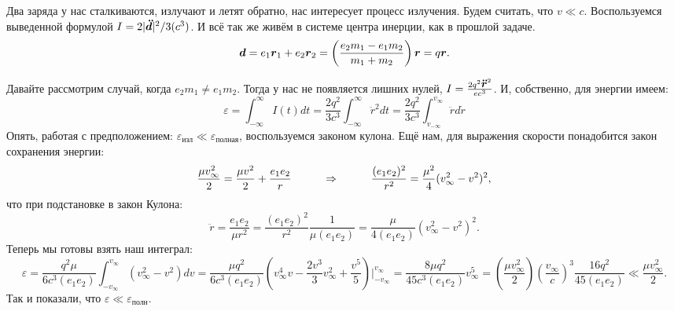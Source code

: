 
Два заряда у нас сталкиваются, излучают и летят обратно, нас интересует процесс излучения. Будем считать, что $v \ll c$.
Воспользуемся выведенной формулой $I = 2 |\mbox{\boldmath $\ddot{d}$}|^2/3(c^3)$.
И всё так же живём в системе центра инерции, как в прошлой задаче.
\begin{equation*}
    \mbox{\boldmath $d$} = e_1 \mbox{\boldmath $r$}_1 + e_2 \mbox{\boldmath $r$}_2 = \left(\frac{e_2 m_1 - e_1 m_2}{m_1 + m_2}\right) \mbox{\boldmath $r$} = q \mbox{\boldmath $r$}.
\end{equation*}

Давайте рассмотрим случай, когда $e_2 m_1 \neq e_1 m_2$. Тогда у нас не появляется лишних нулей, $I = \frac{ 2 q^2 \mbox{\boldmath $\ddot{r}$}^2}{e c^3}$. И, собственно, для энергии имеем:
\begin{equation*}
    \varepsilon = \int_{-\infty}^{\infty} I(t) dt = \frac{2 q^2}{3 c^3} \int_{-\infty}^{\infty} \ddot{r}^2 d t
    =
    \frac{2 q^2}{3 c^3} \int_{v_{-\infty}}^{v_{\infty}} \ddot{r} d \dot{r}
\end{equation*}
Опять, работая с предположением: $\varepsilon_{\text{изл}}\ll \varepsilon_{\text{полная}}$, воспользуемся законом кулона. Ещё нам, для выражения скорости понадобится закон сохранения энергии:
\begin{equation*}
    \frac{\mu v^2_\infty}{2} = \frac{\mu v^2}{2} + \frac{e_1 e_2}{r}
    \hspace{1 cm}
    \Rightarrow
    \hspace{1 cm}
    \frac{(e_1 e_2)^2}{r^2} = \frac{\mu^2}{4} (v_\infty^2 - v^2)^2,
\end{equation*}
что при подстановке в закон Кулона:
\begin{equation*}
    \ddot{r} = \frac{e_1 e_2}{\mu r^2} = \frac{(e_1 e_2)^2}{r^2} \frac{1}{\mu (e_1 e_2)}
    =
    \frac{\mu}{4 (e_1 e_2)} (v_\infty^2 - v^2)^2.
\end{equation*}
Теперь мы готовы взять наш интеграл:
\begin{equation*}
    \varepsilon = \frac{q^2 \mu}{6 c^3 (e_1 e_2)} \int_{- v_\infty}^{v_\infty} (v_\infty^2 - v^2) d v
    =
    \frac{\mu q^2}{6 c^3 (e_1 e_2)} \left(v_\infty^4 v - \frac{2 v^{3}}{3} v_\infty^2 + \frac{v^5}{5}\right) \bigg|_{-v_\infty}^{v_\infty}
    =
    \frac{8 \mu q^2}{45 c^3 (e_1 e_2)} v_\infty^5
    =
    \left(\frac{\mu v_\infty^2}{2}\right) \left(\frac{v_\infty}{c}\right)^3 \frac{16 q^2}{45 (e_1 e_2)}
    \ll \frac{\mu v_\infty^2}{2}.
\end{equation*}
Так и показали, что $\varepsilon \ll \varepsilon_{\text{полн}}$.